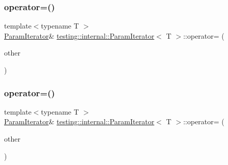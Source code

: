 \mbox{\label{classtesting_1_1internal_1_1_param_iterator_a8019f54ea1c66ca39ffdec47acfabfe6}} 
\subsubsection{\texorpdfstring{operator=()}{operator=()}\hspace{0.1cm}{\footnotesize\ttfamily [2/3]}}
{\footnotesize\ttfamily template$<$typename T $>$ \\
\mbox{\hyperlink{classtesting_1_1internal_1_1_param_iterator}{Param\+Iterator}}\& \mbox{\hyperlink{classtesting_1_1internal_1_1_param_iterator}{testing\+::internal\+::\+Param\+Iterator}}$<$ T $>$\+::operator= (\begin{DoxyParamCaption}\item[{const \mbox{\hyperlink{classtesting_1_1internal_1_1_param_iterator}{Param\+Iterator}}$<$ T $>$ \&}]{other }\end{DoxyParamCaption})\hspace{0.3cm}{\ttfamily [inline]}}

\mbox{\label{classtesting_1_1internal_1_1_param_iterator_a8019f54ea1c66ca39ffdec47acfabfe6}} 
\subsubsection{\texorpdfstring{operator=()}{operator=()}\hspace{0.1cm}{\footnotesize\ttfamily [3/3]}}
{\footnotesize\ttfamily template$<$typename T $>$ \\
\mbox{\hyperlink{classtesting_1_1internal_1_1_param_iterator}{Param\+Iterator}}\& \mbox{\hyperlink{classtesting_1_1internal_1_1_param_iterator}{testing\+::internal\+::\+Param\+Iterator}}$<$ T $>$\+::operator= (\begin{DoxyParamCaption}\item[{const \mbox{\hyperlink{classtesting_1_1internal_1_1_param_iterator}{Param\+Iterator}}$<$ T $>$ \&}]{other }\end{DoxyParamCaption})\hspace{0.3cm}{\ttfamily [inline]}}

